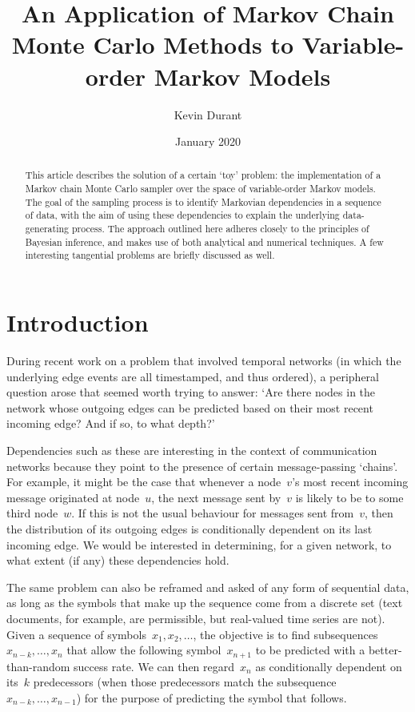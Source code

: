 \documentclass[11pt,a4paper]{article}
\title{An Application of Markov Chain Monte Carlo Methods to Variable-order
  Markov Models}
\author{Kevin Durant}
\date{January 2020}
\begin{document}
\maketitle

\begin{abstract}
This article describes the solution of a certain `toy' problem: the
implementation of a Markov chain Monte Carlo sampler over the space of
variable-order Markov models. The goal of the sampling process is to identify
Markovian dependencies in a sequence of data, with the aim of using these
dependencies to explain the underlying data-generating process. The approach
outlined here adheres closely to the principles of Bayesian inference, and makes
use of both analytical and numerical techniques. A few interesting tangential
problems are briefly discussed as well.
\end{abstract}

\section{Introduction} %

During recent work on a problem that involved temporal networks (in which the
underlying edge events are all timestamped, and thus ordered), a peripheral
question arose that seemed worth trying to answer: `Are there nodes in
the network whose outgoing edges can be predicted based on their most recent
incoming edge? And if so, to what depth?'

Dependencies such as these are interesting in the context of communication
networks because they point to the presence of certain message-passing `chains'.
For example, it might be the case that whenever a node~\(v\)'s most recent
incoming message originated at node~\(u\), the next message sent by~\(v\) is
likely to be to some third node~\(w\). If this is not the usual behaviour for
messages sent from~\(v\), then the distribution of its outgoing edges is
conditionally dependent on its last incoming edge. We would be interested in
determining, for a given network, to what extent (if any) these dependencies
hold.

The same problem can also be reframed and asked of any form of sequential data,
as long as the symbols that make up the sequence come from a discrete set (text
documents, for example, are permissible, but real-valued time series are not).
Given a sequence of symbols~\(x_1, x_2, \dots\), the objective is to find
subsequences~\(x_{n-k}, \dots, x_n\) that allow the following symbol~\(x_{n+1}\)
to be predicted with a better-than-random success rate. We can then
regard~\(x_n\) as conditionally dependent on its~\(k\) predecessors (when those
predecessors match the subsequence~\(x_{n-k}, \dots, x_{n-1}\)) for the purpose
of predicting the symbol that follows.
\end{document}
